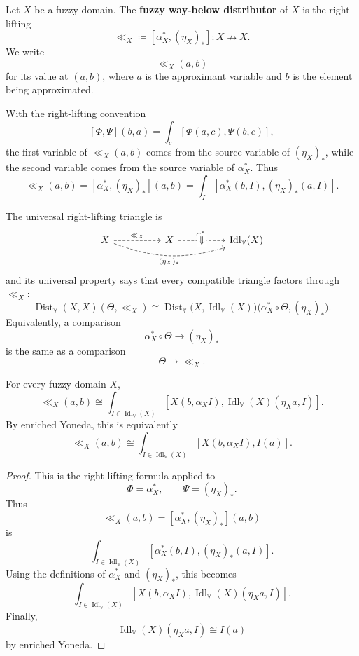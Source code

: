\begin{definition}
\label{def:fuzzy-way-below-distributor}
Let \(X\) be a fuzzy domain. The \textbf{fuzzy way-below distributor} of \(X\)
is the right lifting
\[
    \ll_X
    \coloneqq
    [\alpha_X^\ast,(\eta_X)_\ast]
    :
    X\nrightarrow X.
\]
We write
\[
    \ll_X(a,b)
\]
for its value at \((a,b)\), where \(a\) is the approximant variable and \(b\) is
the element being approximated.
\end{definition}

With the right-lifting convention
\[
    [\Phi,\Psi](b,a)=\int_c[\Phi(a,c),\Psi(b,c)],
\]
the first variable of \(\ll_X(a,b)\) comes from the source variable of
\((\eta_X)_\ast\), while the second variable comes from the source variable of
\(\alpha_X^\ast\). Thus
\[
    \ll_X(a,b)
    =
    [\alpha_X^\ast,(\eta_X)_\ast](a,b)
    =
    \int_I
    [
        \alpha_X^\ast(b,I),
        (\eta_X)_\ast(a,I)
    ].
\]

The universal right-lifting triangle is
\[
\begin{tikzcd}[column sep=huge,row sep=large]
X
    \ar[r,dashed,"\ll_X"]
    \ar[rr,bend right=18,dashed,"{(\eta_X)_\ast}"']
&
X
    \ar[r,dashed,"\alpha_X^\ast"]
&
\operatorname{Idl}_{\mathbb V}(X)
\ar[phantom,from=1-2,to=1-3,"\Downarrow" description]
\end{tikzcd}
\]
and its universal property says that every compatible triangle factors through
\(\ll_X\):
\[
    \operatorname{Dist}_{\mathbb V}(X,X)(\Theta,\ll_X)
    \cong
    \operatorname{Dist}_{\mathbb V}
    \bigl(X,\operatorname{Idl}_{\mathbb V}(X)\bigr)
    \bigl(\alpha_X^\ast\circ\Theta,(\eta_X)_\ast\bigr).
\]
Equivalently, a comparison
\[
    \alpha_X^\ast\circ\Theta\to(\eta_X)_\ast
\]
is the same as a comparison
\[
    \Theta\to\ll_X.
\]

\begin{proposition}
\label{prop:fuzzy-way-below-formula}
For every fuzzy domain \(X\),
\[
    \ll_X(a,b)
    \cong
    \int_{I\in \operatorname{Idl}_{\mathbb V}(X)}
    \left[
        X(b,\alpha_X I),
        \operatorname{Idl}_{\mathbb V}(X)(\eta_X a,I)
    \right].
\]
By enriched Yoneda, this is equivalently
\[
    \ll_X(a,b)
    \cong
    \int_{I\in \operatorname{Idl}_{\mathbb V}(X)}
    \left[
        X(b,\alpha_X I),
        I(a)
    \right].
\]
\end{proposition}

\begin{proof}
This is the right-lifting formula applied to
\[
    \Phi=\alpha_X^\ast,
    \qquad
    \Psi=(\eta_X)_\ast.
\]
Thus
\[
    \ll_X(a,b)
    =
    [\alpha_X^\ast,(\eta_X)_\ast](a,b)
\]
is
\[
    \int_{I\in \operatorname{Idl}_{\mathbb V}(X)}
    [
        \alpha_X^\ast(b,I),
        (\eta_X)_\ast(a,I)
    ].
\]
Using the definitions of \(\alpha_X^\ast\) and \((\eta_X)_\ast\), this becomes
\[
    \int_{I\in \operatorname{Idl}_{\mathbb V}(X)}
    \left[
        X(b,\alpha_X I),
        \operatorname{Idl}_{\mathbb V}(X)(\eta_X a,I)
    \right].
\]
Finally,
\[
    \operatorname{Idl}_{\mathbb V}(X)(\eta_X a,I)
    \cong
    I(a)
\]
by enriched Yoneda.
\end{proof}

